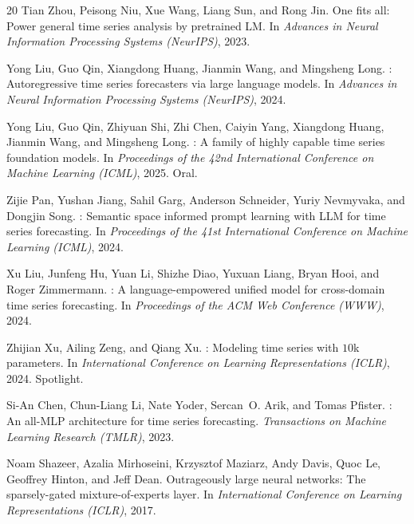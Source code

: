 \documentclass{article}
\begin{document}
\begin{thebibliography}{20}
Tian Zhou, Peisong Niu, Xue Wang, Liang Sun, and Rong Jin.
\newblock One fits all: Power general time series analysis by pretrained {LM}.
\newblock In \textit{Advances in Neural Information Processing Systems (NeurIPS)}, 2023.

Yong Liu, Guo Qin, Xiangdong Huang, Jianmin Wang, and Mingsheng Long.
: Autoregressive time series forecasters via large language models.
\newblock In \textit{Advances in Neural Information Processing Systems (NeurIPS)}, 2024.

Yong Liu, Guo Qin, Zhiyuan Shi, Zhi Chen, Caiyin Yang, Xiangdong Huang, Jianmin Wang, and Mingsheng Long.
: A family of highly capable time series foundation models.
\newblock In \textit{Proceedings of the 42nd International Conference on Machine Learning (ICML)}, 2025.
\newblock Oral.

Zijie Pan, Yushan Jiang, Sahil Garg, Anderson Schneider, Yuriy Nevmyvaka, and Dongjin Song.
: Semantic space informed prompt learning with {LLM} for time series forecasting.
\newblock In \textit{Proceedings of the 41st International Conference on Machine Learning (ICML)}, 2024.

Xu Liu, Junfeng Hu, Yuan Li, Shizhe Diao, Yuxuan Liang, Bryan Hooi, and Roger Zimmermann.
: A language-empowered unified model for cross-domain time series forecasting.
\newblock In \textit{Proceedings of the ACM Web Conference (WWW)}, 2024.

Zhijian Xu, Ailing Zeng, and Qiang Xu.
: Modeling time series with $10$k parameters.
\newblock In \textit{International Conference on Learning Representations (ICLR)}, 2024.
\newblock Spotlight.

Si-An Chen, Chun-Liang Li, Nate Yoder, Sercan~O. Arik, and Tomas Pfister.
: An all-{MLP} architecture for time series forecasting.
\newblock \textit{Transactions on Machine Learning Research (TMLR)}, 2023.

Noam Shazeer, Azalia Mirhoseini, Krzysztof Maziarz, Andy Davis, Quoc Le, Geoffrey Hinton, and Jeff Dean.
\newblock Outrageously large neural networks: The sparsely-gated mixture-of-experts layer.
\newblock In \textit{International Conference on Learning Representations (ICLR)}, 2017.


\end{thebibliography}
\end{document}
